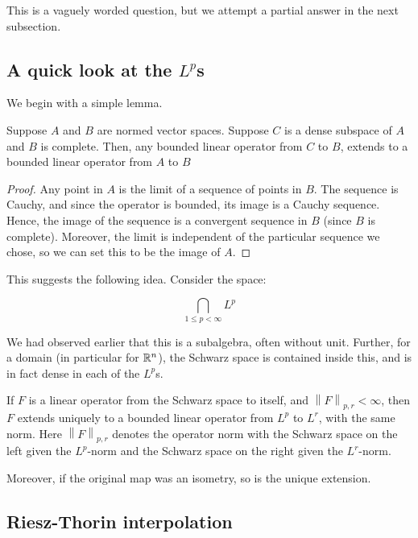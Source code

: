 \documentclass[a4paper]{amsart}
\newcommand{\norm}[1]{\left\|#1\right\|}
\begin{document}
This is a vaguely worded question, but we attempt a partial answer in
the next subsection.

\subsection{A quick look at the $L^p$s}

We begin with a simple lemma.

\begin{lemma}
  Suppose $A$ and $B$ are normed vector spaces. Suppose $C$ is a dense
  subspace of $A$ and $B$ is complete. Then, any bounded linear
  operator from $C$ to $B$, extends to a bounded linear operator from
  $A$ to $B$
\end{lemma}

\begin{proof}
  Any point in $A$ is the limit of a sequence of points in $B$. The
  sequence is Cauchy, and since the operator is bounded, its image is
  a Cauchy sequence. Hence, the image of the sequence is a convergent
  sequence in $B$ (since $B$ is complete). Moreover, the limit is
  independent of the particular sequence we chose, so we can set this
  to be the image of $A$.
\end{proof}

This suggests the following idea. Consider the space:

$$\bigcap_{1 \le p < \infty} L^p$$

We had observed earlier that this is a subalgebra, often without
unit. Further, for a domain (in particular for $\mathbb{R}^n$), the Schwarz
space is contained inside this, and is in fact dense in each of the $L^p$s.

\begin{theorem}
  If $F$ is a linear operator from the Schwarz space to itself, and
  $\norm{F}_{p,r} < \infty$, then $F$ extends uniquely to a bounded
  linear operator from $L^p$ to $L^r$, with the same norm. Here
  $\norm{F}_{p,r}$ denotes the operator norm with the Schwarz space on
  the left given the $L^p$-norm and the Schwarz space on the right
  given the $L^r$-norm.

  Moreover, if the original map was an isometry, so is the unique
  extension.
\end{theorem}

\subsection{Riesz-Thorin interpolation}
\end{document}
